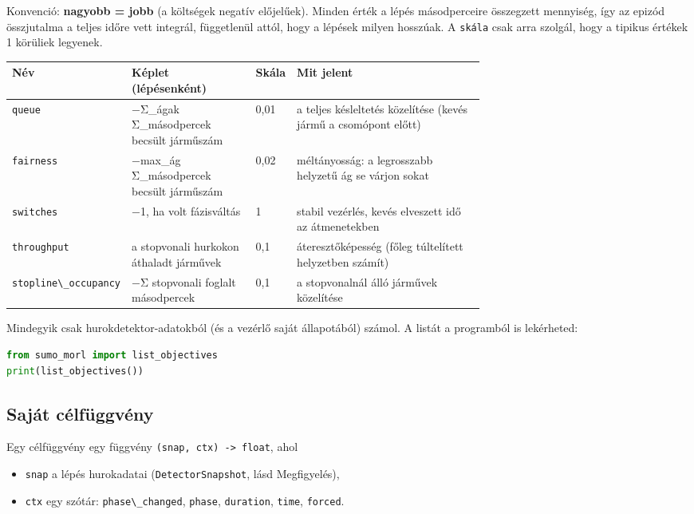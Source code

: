 Konvenció: \textbf{nagyobb = jobb} (a
költségek negatív előjelűek). Minden
érték a lépés másodperceire összegzett
mennyiség, így az epizód összjutalma a
teljes időre vett integrál, függetlenül
attól, hogy a lépések milyen hosszúak. A
\passthrough{\lstinline!skála!} csak
arra szolgál, hogy a tipikus értékek 1
körüliek legyenek.

\begin{longtable}[]{@{}l>{\raggedright\arraybackslash}p{0.27\linewidth}l>{\raggedright\arraybackslash}p{0.42\linewidth}@{}}
\toprule\noalign{}
Név & Képlet (lépésenként) & Skála & Mit
jelent \\
\midrule\noalign{}
\endhead
\bottomrule\noalign{}
\endlastfoot
\passthrough{\lstinline!queue!} &
−Σ\_ágak Σ\_másodpercek becsült
járműszám & 0,01 & a teljes késleltetés
közelítése (kevés jármű a csomópont
előtt) \\
\passthrough{\lstinline!fairness!} &
−max\_ág Σ\_másodpercek becsült
járműszám & 0,02 & méltányosság: a
legrosszabb helyzetű ág se várjon
sokat \\
\passthrough{\lstinline!switches!} & −1,
ha volt fázisváltás & 1 & stabil
vezérlés, kevés elveszett idő az
átmenetekben \\
\passthrough{\lstinline!throughput!} & a
stopvonali hurkokon áthaladt járművek &
0,1 & áteresztőképesség (főleg
túltelített helyzetben számít) \\
\passthrough{\lstinline!stopline\_occupancy!}
& −Σ stopvonali foglalt másodpercek &
0,1 & a stopvonalnál álló járművek
közelítése \\
\end{longtable}

Mindegyik csak hurokdetektor-adatokból
(és a vezérlő saját állapotából) számol.
A listát a programból is lekérheted:

\begin{lstlisting}[language=Python]
from sumo_morl import list_objectives
print(list_objectives())
\end{lstlisting}

\hypertarget{sajuxe1t-cuxe9lfuxfcggvuxe9ny}{%
\subsection{Saját
célfüggvény}\label{sajuxe1t-cuxe9lfuxfcggvuxe9ny}}

Egy célfüggvény egy függvény
\passthrough{\lstinline!(snap, ctx) -> float!},
ahol

\begin{itemize}
\tightlist
\item
  \passthrough{\lstinline!snap!} a lépés
  hurokadatai
  (\passthrough{\lstinline!DetectorSnapshot!},
  lásd Megfigyelés),
\item
  \passthrough{\lstinline!ctx!} egy
  szótár:
  \passthrough{\lstinline!phase\_changed!},
  \passthrough{\lstinline!phase!},
  \passthrough{\lstinline!duration!},
  \passthrough{\lstinline!time!},
  \passthrough{\lstinline!forced!}.
\end{itemize}


